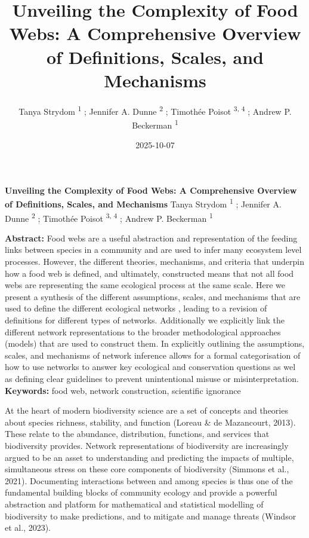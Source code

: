 \documentclass[
]{article}
\title{Unveiling the Complexity of Food Webs: A Comprehensive Overview
of Definitions, Scales, and Mechanisms}
\author{Tanya Strydom %
%
\textsuperscript{%
%
1%
}%
; Jennifer A. Dunne %
%
\textsuperscript{%
%
2%
}%
; Timothée Poisot %
%
\textsuperscript{%
3,%
4%
}%
; Andrew P. Beckerman %
%
\textsuperscript{%
%
1%
}%
}
\date{2025-10-07}
\begin{document}
\thispagestyle{empty}
{\bfseries\sffamily\Large Unveiling the Complexity of Food Webs: A
Comprehensive Overview of Definitions, Scales, and Mechanisms}
\vfil
Tanya Strydom %
%
\textsuperscript{%
%
1%
}%
; Jennifer A. Dunne %
%
\textsuperscript{%
%
2%
}%
; Timothée Poisot %
%
\textsuperscript{%
3,%
4%
}%
; Andrew P. Beckerman %
%
\textsuperscript{%
%
1%
}%

\vfil
{\small
\textbf{Abstract:} Food webs are a useful abstraction and representation
of the feeding links between species in a community and are used to
infer many ecosystem level processes. However, the different theories,
mechanisms, and criteria that underpin how a food web is defined, and
ultimately, constructed means that not all food webs are representing
the same ecological process at the same scale. Here we present a
synthesis of the different assumptions, scales, and mechanisms that are
used to define the different ecological networks , leading to a revision
of definitions for different types of networks. Additionally we
explicitly link the different network representations to the broader
methodological approaches (models) that are used to construct them. In
explicitly outlining the assumptions, scales, and mechanisms of network
inference allows for a formal categorisation of how to use networks to
answer key ecological and conservation questions as wel as defining
clear guidelines to prevent unintentional misuse or misinterpretation.
\vfil
\textbf{Keywords:} %
food web, network construction, %
scientific ignorance%
}
\clearpage
\setcounter{page}{1}
\doublespacing
\linenumbers


At the heart of modern biodiversity science are a set of concepts and
theories about species richness, stability, and function (Loreau \& de
Mazancourt, 2013). These relate to the abundance, distribution,
functions, and services that biodiversity provides. Network
representations of biodiversity are increasingly argued to be an asset
to understanding and predicting the impacts of multiple, simultaneous
stress on these core components of biodiversity (Simmons et al., 2021).
Documenting interactions between and among species is thus one of the
fundamental building blocks of community ecology and provide a powerful
abstraction and platform for mathematical and statistical modelling of
biodiversity to make predictions, and to mitigate and manage threats
(Windsor et al., 2023).
\end{document}
